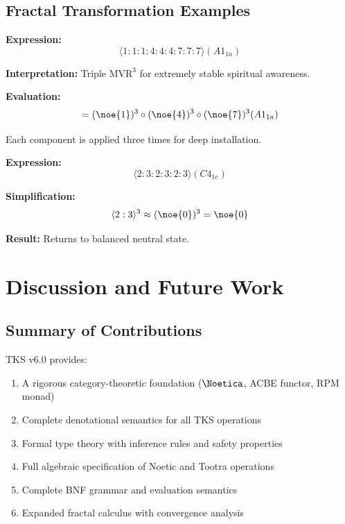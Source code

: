 \section{Fractal Transformation Examples}

\begin{example}
\label{ex:meditation}
\textbf{Expression:}
\[
\langle 1:1:1:4:4:4:7:7:7 \rangle(A1_{1a})
\]

\textbf{Interpretation:} Triple $\mathrm{MVR}^3$ for extremely stable spiritual awareness.

\textbf{Evaluation:}
\[
= (\noe{1})^3 \circ (\noe{4})^3 \circ (\noe{7})^3 (A1_{1a})
\]

Each component is applied three times for deep installation.
\end{example}

\begin{example}
\label{ex:polarity}
\textbf{Expression:}
\[
\langle 2:3:2:3:2:3 \rangle(C4_{1c})
\]

\textbf{Simplification:}
\[
\langle 2:3 \rangle^3 \approx (\noe{0})^3 = \noe{0}
\]

\textbf{Result:} Returns to balanced neutral state.
\end{example}

\chapter{Discussion and Future Work}
\label{ch:discussion}

\section{Summary of Contributions}

TKS v6.0 provides:
\begin{enumerate}
  \item A rigorous category-theoretic foundation ($\Noetica$, ACBE functor, RPM monad)
  \item Complete denotational semantics for all TKS operations
  \item Formal type theory with inference rules and safety properties
  \item Full algebraic specification of Noetic and Tootra operations
  \item Complete BNF grammar and evaluation semantics
  \item Expanded fractal calculus with convergence analysis
\end{enumerate}

